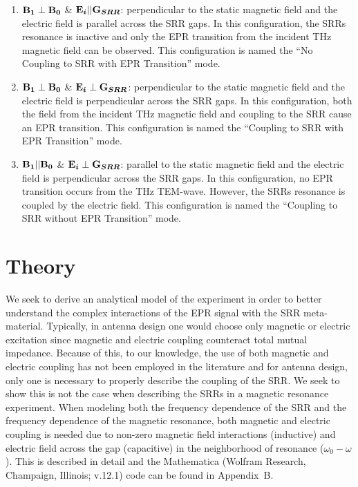 \begin{enumerate}[label=(\Alph*)]
    \item $\textbf{B}\boldsymbol{_{1}} \perp \textbf{B}\boldsymbol{_{0}}$ \& $\textbf{E}\boldsymbol{_{i}}||\textbf{G}\boldsymbol{_{SRR}}$: perpendicular to the static magnetic field and the electric field is parallel across the SRR gaps. In this configuration, the SRRs resonance is inactive and only the EPR transition from the incident THz magnetic field can be observed. This configuration is named the ``No Coupling to SRR with EPR Transition'' mode. 
    \item $\textbf{B}\boldsymbol{_{1}} \perp \textbf{B}\boldsymbol{_{0}}$ \& $\textbf{E}\boldsymbol{_{i}}\perp\textbf{G}\boldsymbol{_{SRR}}$: perpendicular to the static magnetic field and the electric field is perpendicular across the SRR gaps. In this configuration, both the field from the incident THz magnetic field and coupling to the SRR cause an EPR transition. This configuration  is named the ``Coupling to SRR with EPR Transition'' mode.
    \item $\textbf{B}\boldsymbol{_{1}} || \textbf{B}\boldsymbol{_{0}}$ \& $\textbf{E}\boldsymbol{_{i}}\perp\textbf{G}\boldsymbol{_{SRR}}$: parallel to the static magnetic field and the electric field is perpendicular across the SRR gaps. In this configuration, no EPR transition occurs from the THz TEM-wave. However, the SRRs resonance is coupled by the electric field. This configuration is named the ``Coupling to SRR without EPR Transition'' mode.
\end{enumerate}


\section{Theory}
We seek to derive an analytical model of the experiment in order to better understand the complex interactions of the EPR signal with the SRR meta-material. Typically, in antenna design one would choose only magnetic \cite{srrmodel} or electric \cite{Katsarakis04} excitation since magnetic and electric coupling counteract total mutual impedance. Because of this, to our knowledge, the use of both magnetic and electric coupling has not been employed in the literature and for antenna design, only one is necessary to properly describe the coupling of the SRR. \cite{Baena2005,DurnSindreu2012,Bojanic2014,Su2015} We seek to show this is not the case when describing the SRRs in a magnetic resonance experiment. When modeling both the frequency dependence of the SRR and the frequency dependence of the magnetic resonance, both magnetic and electric coupling is needed due to non-zero magnetic field interactions (inductive) and electric field across the gap (capacitive) in the neighborhood of resonance ($\omega_0 - \omega$). This is described in detail and the Mathematica (Wolfram Research, Champaign, Illinois; v.12.1) code can be found in Appendix~B.

